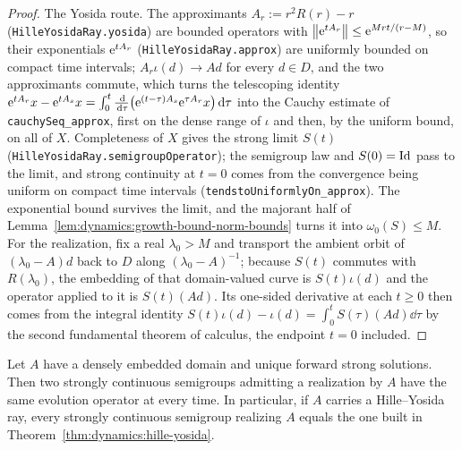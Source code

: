 \begin{proof}
  \leanok
  The Yosida route.  The approximants $A_r:=r^2R(r)-r $
  (\texttt{HilleYosidaRay.yosida}) are bounded operators with
  $\left\|\mathrm{e}^{tA_r}\right\|\leq\mathrm{e}^{Mrt/(r-M)} $, so their exponentials
  $\mathrm{e}^{tA_r} $ (\texttt{HilleYosidaRay.approx}) are uniformly bounded on compact time
  intervals; $A_r\iota(d)\to A d $ for every $d\in D $, and the two approximants commute,
  which turns the telescoping identity
  $\mathrm{e}^{tA_r}x-\mathrm{e}^{tA_s}x=\int_0^t\frac{\,\mathrm{d}}{\,\mathrm{d}\tau}\bigl(\mathrm{e}^{(t-\tau)A_s}\mathrm{e}^{\tau A_r}x\bigr)\,\mathrm{d}\tau $
  into the Cauchy estimate of \texttt{cauchySeq\_approx}, first on the dense range of $\iota $
  and then, by the uniform bound, on all of $X $.  Completeness of $X $ gives the strong
  limit $S(t) $ (\texttt{HilleYosidaRay.semigroupOperator}); the semigroup law and
  $S(0)=\mathrm{Id} $ pass to the limit, and strong continuity at $t=0 $ comes from the convergence
  being uniform on compact time intervals (\texttt{tendstoUniformlyOn\_approx}).  The
  exponential bound survives the limit, and the majorant half of
  Lemma~\ref{lem:dynamics:growth-bound-norm-bounds} turns it into $\omega_0(S)\leq M $.  For
  the realization, fix a real $\lambda_0>M $ and transport the ambient orbit of
  $(\lambda_0-A)d $ back to $D $ along $(\lambda_0-A)^{-1} $; because $S(t) $ commutes with
  $R(\lambda_0) $, the embedding of that domain-valued curve is $S(t)\iota(d) $ and the
  operator applied to it is $S(t)(Ad) $.  Its one-sided derivative at each $t\geq0 $ then
  comes from the integral identity
  $S(t)\iota(d)-\iota(d)=\int_0^tS(\tau)(Ad)\dd\tau $ by the second fundamental theorem of
  calculus, the endpoint $t=0 $ included.
\end{proof}

\begin{lemma}
  \label{lem:dynamics:semigroup-unique}
  \leanok
  Let $A $ have a densely embedded domain and unique forward strong solutions.  Then two
  strongly continuous semigroups admitting a realization by $A $ have the same evolution
  operator at every time.  In particular, if $A $ carries a Hille--Yosida ray, every
  strongly continuous semigroup realizing $A $ equals the one built in
  Theorem~\ref{thm:dynamics:hille-yosida}.
\end{lemma}

